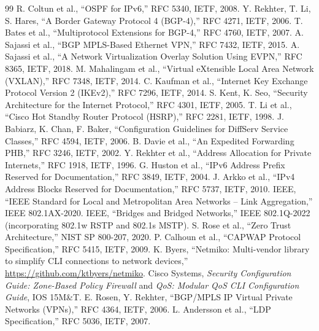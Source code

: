 \documentclass[11pt,a4paper]{article}
\begin{document}
\begin{thebibliography}{99}\small
{} R. Coltun et al., ``OSPF for IPv6,'' RFC 5340, IETF, 2008.
 Y. Rekhter, T. Li, S. Hares, ``A Border Gateway Protocol 4 (BGP-4),'' RFC 4271, IETF, 2006.
 T. Bates et al., ``Multiprotocol Extensions for BGP-4,'' RFC 4760, IETF, 2007.
 A. Sajassi et al., ``BGP MPLS-Based Ethernet VPN,'' RFC 7432, IETF, 2015.
 A. Sajassi et al., ``A Network Virtualization Overlay Solution Using EVPN,'' RFC 8365, IETF, 2018.
 M. Mahalingam et al., ``Virtual eXtensible Local Area Network (VXLAN),'' RFC 7348, IETF, 2014.
 C. Kaufman et al., ``Internet Key Exchange Protocol Version 2 (IKEv2),'' RFC 7296, IETF, 2014.
 S. Kent, K. Seo, ``Security Architecture for the Internet Protocol,'' RFC 4301, IETF, 2005.
 T. Li et al., ``Cisco Hot Standby Router Protocol (HSRP),'' RFC 2281, IETF, 1998.
 J. Babiarz, K. Chan, F. Baker, ``Configuration Guidelines for DiffServ Service Classes,'' RFC 4594, IETF, 2006.
 B. Davie et al., ``An Expedited Forwarding PHB,'' RFC 3246, IETF, 2002.
 Y. Rekhter et al., ``Address Allocation for Private Internets,'' RFC 1918, IETF, 1996.
 G. Huston et al., ``IPv6 Address Prefix Reserved for Documentation,'' RFC 3849, IETF, 2004.
 J. Arkko et al., ``IPv4 Address Blocks Reserved for Documentation,'' RFC 5737, IETF, 2010.
 IEEE, ``IEEE Standard for Local and Metropolitan Area Networks -- Link Aggregation,'' IEEE 802.1AX-2020.
 IEEE, ``Bridges and Bridged Networks,'' IEEE 802.1Q-2022 (incorporating 802.1w RSTP and 802.1s MSTP).
 S. Rose et al., ``Zero Trust Architecture,'' NIST SP 800-207, 2020.
 P. Calhoun et al., ``CAPWAP Protocol Specification,'' RFC 5415, IETF, 2009.
 K. Byers, ``Netmiko: Multi-vendor library to simplify CLI connections to network devices,'' \url{https://github.com/ktbyers/netmiko}.
 Cisco Systems, \emph{Security Configuration Guide: Zone-Based Policy Firewall} and \emph{QoS: Modular QoS CLI Configuration Guide}, IOS 15M\&T.
 E. Rosen, Y. Rekhter, ``BGP/MPLS IP Virtual Private Networks (VPNs),'' RFC 4364, IETF, 2006.
 L. Andersson et al., ``LDP Specification,'' RFC 5036, IETF, 2007.
\end{thebibliography}
\end{document}
